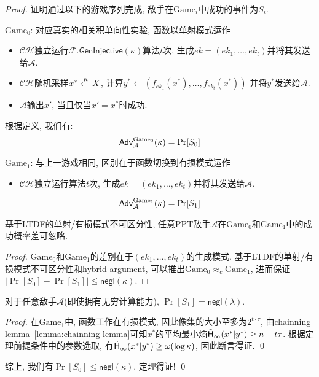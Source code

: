 \begin{proof}
证明通过以下的游戏序列完成, 敌手在$\text{Game}_i$中成功的事件为$S_i$.  
\begin{trivlist}
\item $\text{Game}_0$: 对应真实的相关积单向性实验, 函数以单射模式运作 
\begin{itemize}
    \item $\mathcal{CH}$独立运行$\mathcal{F}.\mathsf{GenInjective}(\kappa)$算法$t$次, 
    	生成$ek = (ek_1, \dots, ek_t)$并将其发送给$\mathcal{A}$. 
    \item $\mathcal{CH}$随机采样$x^* \xleftarrow{\textup{\tiny R}} X$, 计算$y^* \leftarrow (f_{ek_1}(x^*), \dots, f_{ek_t}(x^*))$
    	并将$y^*$发送给$\mathcal{A}$. 
    \item $\mathcal{A}$输出$x'$, 当且仅当$x' =  x^*$时成功. 
\end{itemize}
根据定义, 我们有:
\begin{equation*}
\mathsf{Adv}_\mathcal{A}^{\text{Game}_0}(\kappa) = \Pr[S_0]
\end{equation*}

\item $\text{Game}_1$: 与上一游戏相同, 区别在于函数切换到有损模式运作 
\begin{itemize}
    \item $\mathcal{CH}$独立运行算法$t$次, 
    	生成$ek = (ek_1, \dots, ek_t)$并将其发送给$\mathcal{A}$. 
\end{itemize}
\begin{equation*}
\mathsf{Adv}_\mathcal{A}^{\text{Game}_1}(\kappa) = \Pr[S_1]
\end{equation*}
\end{trivlist}

\begin{claim}
基于LTDF的单射/有损模式不可区分性, 任意PPT敌手$\mathcal{A}$在$\text{Game}_0$和$\text{Game}_1$中的成功概率差可忽略. 
\end{claim}

\begin{proof}
$\text{Game}_0$和$\text{Game}_1$的差别在于$(ek_1, \dots, ek_t)$的生成模式. 
基于LTDF的单射/有损模式不可区分性和hybrid argument, 可以推出$\text{Game}_0 \approx_c \text{Game}_1$, 
进而保证$|\Pr[S_0] - \Pr[S_1]| \leq \mathsf{negl}(\kappa)$.  
\end{proof}

\begin{claim}
对于任意敌手$\mathcal{A}$(即使拥有无穷计算能力), $\Pr[S_1] = \mathsf{negl}(\lambda)$. 
\end{claim}

\begin{proof}
在$\text{Game}_1$中, 函数工作在有损模式, 因此像集的大小至多为$2^{t \cdot \tau}$, 
由chainning lemma~\ref{lemma:chainning-lemma}可知$x^*$的平均最小熵$\tilde{\mathsf{H}}_\infty(x^*|y^*) \geq n - t \tau$. 
根据定理前提条件中的参数选取, 有$\tilde{\mathsf{H}}_\infty(x^*|y^*) \geq \omega(\log \kappa)$, 因此断言得证. \qed
\end{proof}

综上, 我们有$\Pr[S_0] \leq \mathsf{negl}(\kappa)$. 定理得证! \qed
\end{proof}


